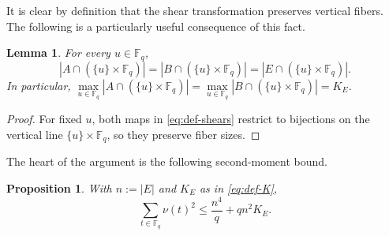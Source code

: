 \documentclass{article}
\newtheorem{proposition}[theorem]{Proposition}
\newtheorem{lemma}[theorem]{Lemma}
\newcommand{\F}{\mathbb{F}}
\newcommand{\abs}[1]{\left|#1\right|}
\newcommand{\1}{\mathbf{1}}
\begin{document}
It is clear by definition that the shear transformation preserves vertical fibers. The following is a particularly useful consequence of this fact.

\begin{lemma}\label{lem:K-preserved}
For every $u\in \F_q$,
\[
\abs{A\cap(\{u\}\times \F_q)}=\abs{B\cap(\{u\}\times \F_q)}=\abs{E\cap(\{u\}\times \F_q)}.
\]
In particular, $\max\limits_{u\in \F_q}\abs{A\cap(\{u\}\times\F_q)}=\max\limits_{u\in \F_q}\abs{B\cap(\{u\}\times\F_q)}=K_E$.
\end{lemma}

\begin{proof}
For fixed $u$, both maps in \eqref{eq:def-shears} restrict to bijections on the vertical line $\{u\}\times\F_q$, so they preserve fiber sizes.
\end{proof}

The heart of the argument is the following second-moment bound.

\begin{proposition}\label{prop:second-moment}
With $n:=|E|$ and $K_E$ as in \eqref{eq:def-K},
\begin{equation}\label{eq:second-moment-bound}
\sum_{t\in \F_q}\nu(t)^2
\le
\frac{n^4}{q}+qn^2K_E.
\end{equation}
\end{proposition}
\end{document}
